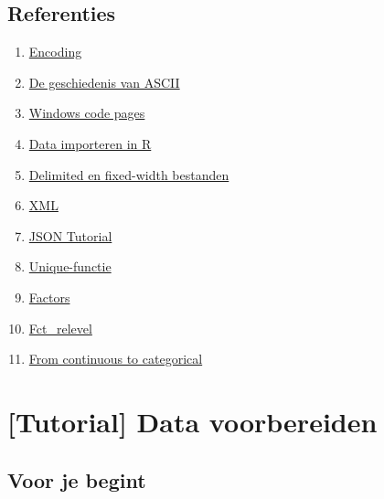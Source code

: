 \documentclass[]{tufte-book}
\providecommand{\tightlist}{%
  \setlength{\itemsep}{0pt}\setlength{\parskip}{0pt}}
\begin{document}
\hypertarget{referenties-3}{%
\section*{Referenties}\label{referenties-3}}

\begin{enumerate}
\def\labelenumi{\arabic{enumi}.}
\tightlist
\item
  \href{http://kunststube.net/encoding/}{Encoding}
\item
  \href{https://www.joelonsoftware.com/2003/10/08/the-absolute-minimum-every-software-developer-absolutely-positively-must-know-about-unicode-and-character-sets-no-excuses/}{De geschiedenis van ASCII}
\item
  \href{https://en.wikipedia.org/wiki/Windows_code_page}{Windows code pages}
\item
  \href{http://r4ds.had.co.nz/data-import.html}{Data importeren in R}
\item
  \href{https://www.techwalla.com/articles/what-is-a-delimited-a-fixed-width-file}{Delimited en fixed-width bestanden}
\item
  \href{https://www.w3schools.com/xml/default.asp}{XML}
\item
  \href{http://beginnersbook.com/2015/04/json-tutorial/}{JSON Tutorial}
\item
  \href{https://chemicalstatistician.wordpress.com/2018/03/10/use-unique-instead-of-levels-to-find-the-possible-values-of-a-character-variable-in-r/}{Unique-functie}
\item
  \href{http://r4ds.had.co.nz/factors.html}{Factors}
\item
  \href{http://forcats.tidyverse.org/reference/fct_relevel.html}{Fct\_relevel}
\item
  \href{http://rforpublichealth.blogspot.be/2012/09/from-continuous-to-categorical.html}{From continuous to categorical}
\end{enumerate}

\hypertarget{tutorial-data-voorbereiden}{%
\chapter{{[}Tutorial{]} Data voorbereiden}\label{tutorial-data-voorbereiden}}

\hypertarget{voor-je-begint-2}{%
\section{Voor je begint}\label{voor-je-begint-2}}
\end{document}
